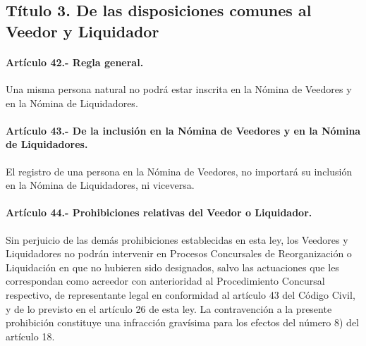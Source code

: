 \documentclass[
]{book}
\begin{document}
\hypertarget{tuxedtulo-3.-de-las-disposiciones-comunes-al-veedor-y-liquidador}{%
\subsection*{Título 3. De las disposiciones comunes al Veedor y Liquidador}\label{tuxedtulo-3.-de-las-disposiciones-comunes-al-veedor-y-liquidador}}

\hypertarget{artuxedculo-42.--regla-general.}{%
\paragraph*{Artículo 42.- Regla general.}\label{artuxedculo-42.--regla-general.}}

Una misma persona natural no podrá estar inscrita en la Nómina de Veedores y en la Nómina de Liquidadores.

\hypertarget{artuxedculo-43.--de-la-inclusiuxf3n-en-la-nuxf3mina-de-veedores-y-en-la-nuxf3mina-de-liquidadores.}{%
\paragraph*{Artículo 43.- De la inclusión en la Nómina de Veedores y en la Nómina de Liquidadores.}\label{artuxedculo-43.--de-la-inclusiuxf3n-en-la-nuxf3mina-de-veedores-y-en-la-nuxf3mina-de-liquidadores.}}

El registro de una persona en la Nómina de Veedores, no importará su inclusión en la Nómina de Liquidadores, ni viceversa.

\hypertarget{artuxedculo-44.--prohibiciones-relativas-del-veedor-o-liquidador.}{%
\paragraph*{Artículo 44.- Prohibiciones relativas del Veedor o Liquidador.}\label{artuxedculo-44.--prohibiciones-relativas-del-veedor-o-liquidador.}}

Sin perjuicio de las demás prohibiciones establecidas en esta ley, los Veedores y Liquidadores no podrán intervenir en Procesos Concursales de Reorganización o Liquidación en que no hubieren sido designados, salvo las actuaciones que les correspondan como acreedor con anterioridad al Procedimiento Concursal respectivo, de representante legal en conformidad al artículo 43 del Código Civil, y de lo previsto en el artículo 26 de esta ley. La contravención a la presente prohibición constituye una infracción gravísima para los efectos del número 8) del artículo 18.
\end{document}
